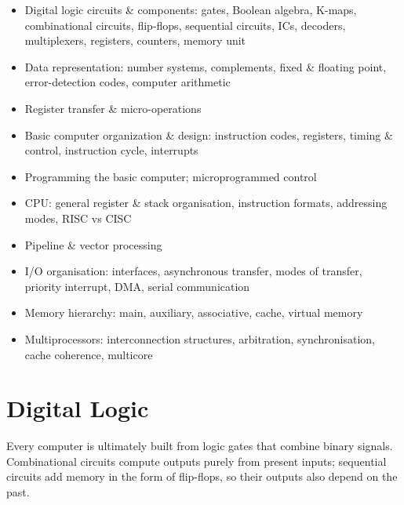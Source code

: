 

\begin{sylbox}

\begin{itemize}
\tightlist
\item[$\square$]
  Digital logic circuits \& components: gates, Boolean algebra, K-maps, combinational circuits, flip-flops, sequential circuits, ICs, decoders, multiplexers, registers, counters, memory unit
\item[$\square$]
  Data representation: number systems, complements, fixed \& floating point, error-detection codes, computer arithmetic
\item[$\square$]
  Register transfer \& micro-operations
\item[$\square$]
  Basic computer organization \& design: instruction codes, registers, timing \& control, instruction cycle, interrupts
\item[$\square$]
  Programming the basic computer; microprogrammed control
\item[$\square$]
  CPU: general register \& stack organisation, instruction formats, addressing modes, RISC vs CISC
\item[$\square$]
  Pipeline \& vector processing
\item[$\square$]
  I/O organisation: interfaces, asynchronous transfer, modes of transfer, priority interrupt, DMA, serial communication
\item[$\square$]
  Memory hierarchy: main, auxiliary, associative, cache, virtual memory
\item[$\square$]
  Multiprocessors: interconnection structures, arbitration, synchronisation, cache coherence, multicore
\end{itemize}

\end{sylbox}

\needspace{161pt}

\hypertarget{p2-02--1-digital-logic}{%
\section{Digital Logic}\label{p2-02--1-digital-logic}}

Every computer is ultimately built from logic gates that combine binary signals. Combinational circuits
compute outputs purely from present inputs; sequential circuits add memory in the form of flip-flops, so
their outputs also depend on the past.

